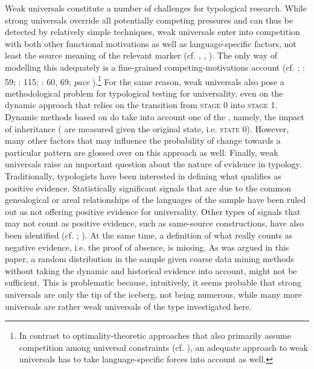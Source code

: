 \documentclass[output=paper]{langsci/langscibook}
\begin{document}
Weak universals constitute a number of challenges for typological research. While strong universals override all potentially competing pressures and can thus be detected by relatively simple techniques, weak universals enter into competition with both other functional motivations as well as language-specific factors, not least the source meaning of the relevant marker (cf. \citealt{Cristofaro2012}, \citealt{Cristofaro2017_Dep}, \citealt{Hammarström2015}). The only way of modelling this adequately is a fine-grained competing-motivations account (cf. \citealt{Haiman1983}; \citealt{DuBois1985,Croft2003}: 59; \citealt{Bickel2014}: 115; \citealt{Hawkins2014_CompMot}: 60, 69; \textit{pace} ).\footnote{In contrast to optimality-theoretic approaches that also primarily assume competition among universal constraints (cf. \citealt{Aissen2003}), an adequate approach to weak universals has to take language-specific forces into account as well.} For the same reason, weak universals also pose a methodological problem for typological testing for universality, even on the dynamic approach that relies on the transition from \textsc{stage} 0 into \textsc{stage} 1. Dynamic methods based on  do take into account one of the , namely, the impact of inheritance ( are measured given the original state, i.e. \textsc{state 0}). However, many other factors that may influence the probability of change towards a particular pattern are glossed over on this approach as well. Finally, weak universals raise an important question about the nature of evidence in typology. Traditionally, typologists have been interested in defining what qualifies as positive evidence. Statistically significant signals that are due to the common genealogical or areal relationships of the languages of the sample have been ruled out as not offering positive evidence for universality. Other types of signals that may not count as positive evidence, such as same-source constructions, have also been identified (cf. \citealt{Cristofaro2017}; ). At the same time, a definition of what really counts as negative evidence, i.e. the proof of absence, is missing. As was argued in this paper, a random distribution in the sample given coarse data mining methods without taking the dynamic and historical evidence into account, might not be sufficient. This is problematic because, intuitively, it seems probable that strong universals are only the tip of the iceberg, not being numerous, while many more universals are rather weak universals of the type investigated here. 
\end{document}
